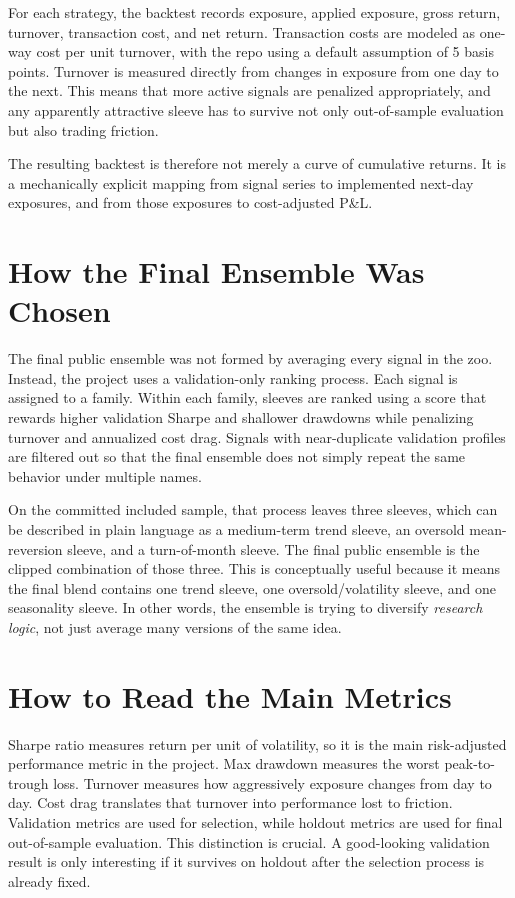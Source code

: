 \documentclass[11pt]{article}
\begin{document}
For each strategy, the backtest records exposure, applied exposure, gross
return, turnover, transaction cost, and net return. Transaction costs are
modeled as one-way cost per unit turnover, with the repo using a
default assumption of 5 basis points. Turnover is measured directly from changes
in exposure from one day to the next. This means that more active signals are
penalized appropriately, and any apparently attractive sleeve has to survive not
only out-of-sample evaluation but also trading friction.

The resulting backtest is therefore not merely a curve of cumulative returns. It
is a mechanically explicit mapping from signal series to implemented next-day
exposures, and from those exposures to cost-adjusted P\&L.

\section*{How the Final Ensemble Was Chosen}

The final public ensemble was not formed by averaging every signal in the zoo.
Instead, the project uses a validation-only ranking process. Each signal is
assigned to a family. Within each family, sleeves are ranked using a score that
rewards higher validation Sharpe and shallower drawdowns while penalizing
turnover and annualized cost drag. Signals with near-duplicate validation
profiles are filtered out so that the final ensemble does not simply repeat the
same behavior under multiple names.

On the committed included sample, that process leaves three sleeves, which can be
described in plain language as a medium-term trend sleeve, an oversold
mean-reversion sleeve, and a turn-of-month sleeve. The final public ensemble is
the clipped combination of those three. This is conceptually useful because it means the final blend
contains one trend sleeve, one oversold/volatility sleeve, and one seasonality
sleeve. In other words, the ensemble is trying to diversify \emph{research
logic}, not just average many versions of the same idea.

\section*{How to Read the Main Metrics}

Sharpe ratio measures return per unit of volatility, so it is the main
risk-adjusted performance metric in the project. Max drawdown measures the worst
peak-to-trough loss. Turnover measures how aggressively exposure changes from day
to day. Cost drag translates that turnover into performance lost to friction.
Validation metrics are used for selection, while holdout metrics are used for
final out-of-sample evaluation. This distinction is crucial. A good-looking
validation result is only interesting if it survives on holdout after the
selection process is already fixed.
\end{document}
